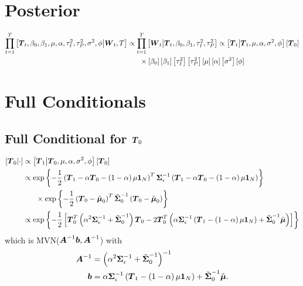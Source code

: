 \documentclass{article}\usepackage[]{graphicx}\usepackage[]{color}
\def\bm#1{\mbox{\boldmath $#1$}}
\begin{document}
\section{Posterior}
%
\begin{align*}
%
\prod_{t = 1}^T \left[ \bm{T}_t, \beta_0, \beta_1, \mu, \alpha, \tau^2_I, \tau^2_P, \sigma^2, \phi \middle| \bm{W}_t, T \right] & \propto \prod_{t = 1}^T \left[ \bm{W}_t \middle| \bm{T}_t, \beta_0, \beta_1, \tau^2_I, \tau^2_P \right] \propto \left[ \bm{T}_t \middle| \bm{T}_t, \mu, \alpha, \sigma^2, \phi \right] \left[ \bm{T}_0 \right] \\ 
& \hspace{6mm} \times \left[ \beta_0 \right] \left[ \beta_1 \right] \left[ \tau^2_I \right] \left[ \tau^2_P \right] \left[ \mu \right] \left[ \alpha \right] \left[ \sigma^2 \right] \left[ \phi \right] 
%
\end{align*}
%
%
\section{Full Conditionals}
%
%
\subsection{Full Conditional for $\bm{T}_0$}
%
\begin{align*}
%
\left[ \bm{T}_0 \middle| \cdot \right] & \propto \left[ \bm{T}_1 \middle| \bm{T}_0, \mu, \alpha, \sigma^2, \phi \right] \left[ \bm{T}_0 \right] \\
%
& \propto \exp{ \left\{ - \frac{1} {2} \left( \bm{T}_1 - \alpha \bm{T}_0 - \left( 1 - \alpha \right) \mu \bm{1}_N \right)^T \bm{\Sigma}_\epsilon^{ - 1} \left( \bm{T}_1 - \alpha \bm{T}_0 - \left( 1 - \alpha \right) \mu \bm{1}_N \right) \right\} }\\
& \hspace{6mm} \times \exp{ \left\{ - \frac{1} {2} \left( \bm{T}_0 - \tilde{\bm{\mu}}_0 \right)^T \tilde{\bm{\Sigma}}_0^{ - 1} \left( \bm{T}_0 - \tilde{\bm{\mu}}_0 \right) \right\} }\\
%
& \propto \exp{ \left\{ - \frac{1} {2} \left[ \bm{T}_0^T \left( \alpha^2 \bm{\Sigma}_\epsilon^{ - 1} + \tilde{\bm{\Sigma}}_0^{ - 1} \right) \bm{T}_0 - 2 \bm{T}_0^T \left( \alpha \bm{\Sigma}_\epsilon^{ - 1} \left( \bm{T}_1 - \left( 1 - \alpha \right) \mu \bm{1}_N \right) + \tilde{\bm{\Sigma}}_0^{ - 1} \tilde{\bm{\mu}} \right) \right]\right\} }
%
\end{align*}
% 
which is MVN($\bm{A}^{ - 1}\bm{b}, \bm{A}^{ - 1}$) with \\
%
\begin{align*}
%
\bm{A}^{ - 1} & = \left( \alpha^2 \bm{\Sigma}_\epsilon^{ - 1} + \tilde{\bm{\Sigma}}_0^{ - 1} \right)^{ - 1}\\
%
\bm{b} & = \alpha \bm{\Sigma}_\epsilon^{ - 1} \left( \bm{T}_1 - \left( 1 - \alpha \right) \mu \bm{1}_N \right) + \tilde{\bm{\Sigma}}_0^{ - 1} \tilde{\bm{\mu}}.
%
\end{align*}
%
\end{document}
